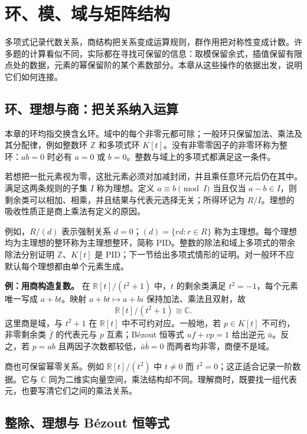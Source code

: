 \documentclass[12pt,fontset=fandol]{ctexart}
\begin{document}
\section{环、模、域与矩阵结构}

多项式记录代数关系，商结构把关系变成运算规则，群作用把对称性变成计数。许多题的计算看似不同，实际都在寻找可保留的信息：取模保留余式，插值保留有限点处的数据，元素的幂保留阶的某个素数部分。本章从这些操作的依据出发，说明它们如何连接。

\subsection{环、理想与商：把关系纳入运算}

\label{app:algebra-quotient}

本章的环均指交换含幺环。域中的每个非零元都可除；一般环只保留加法、乘法及其分配律，例如整数环 $\mathbb Z$ 和多项式环 $K[t]$。没有非零零因子的非零环称为整环：$ab=0$ 时必有 $a=0$ 或 $b=0$。整数与域上的多项式都满足这一条件。

若想把一批元素视为零，这批元素必须对加减封闭，并且乘任意环元后仍在其中。满足这两条规则的子集 $I$ 称为理想。定义 $a\equiv b\pmod I$ 当且仅当 $a-b\in I$，则剩余类可以相加、相乘，并且结果与代表元选择无关；所得环记为 $R/I$。理想的吸收性质正是商上乘法有定义的原因。

例如，$R/(d)$ 表示强制关系 $d=0$；$(d)=\{rd:r\in R\}$ 称为主理想。每个理想均为主理想的整环称为主理想整环，简称 PID。整数的除法和域上多项式的带余除法分别证明 $\mathbb Z$、$K[t]$ 是 PID；下一节给出多项式情形的证明。对一般环不应默认每个理想都由单个元素生成。

\textbf{例：用商构造复数。} 在 $\mathbb R[t]/(t^2+1)$ 中，$t$ 的剩余类满足 $t^2=-1$，每个元素唯一写成 $a+bt$。映射 $a+bt\mapsto a+bi$ 保持加法、乘法且双射，故
\[
\mathbb R[t]/(t^2+1)\cong\mathbb C.
\]
这里商是域，与 $t^2+1$ 在 $\mathbb R[t]$ 中不可约对应。一般地，若 $p\in K[t]$ 不可约，非零剩余类 $\bar f$ 的代表元与 $p$ 互素；Bézout 恒等式 $uf+vp=1$ 给出逆元 $\bar u$。反之，若 $p=ab$ 且两因子次数都较低，$\bar a\bar b=0$ 而两者均非零，商便不是域。

商也可保留幂零关系。例如 $\mathbb R[t]/(t^2)$ 中 $t\ne0$ 而 $t^2=0$；这正适合记录一阶数据。它与 $\mathbb C$ 同为二维实向量空间，乘法结构却不同。理解商时，既要找一组代表元，也要写清它们之间的乘法关系。

\subsection{整除、理想与 Bézout 恒等式}
\end{document}
